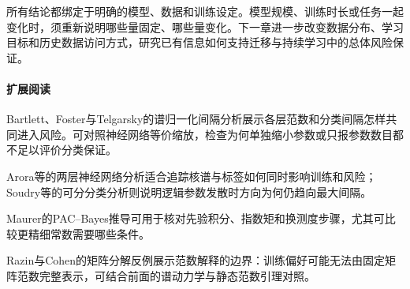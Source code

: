 所有结论都绑定于明确的模型、数据和训练设定。模型规模、训练时长或任务一起变化时，须重新说明哪些量固定、哪些量变化。下一章进一步改变数据分布、学习目标和历史数据访问方式，研究已有信息如何支持迁移与持续学习中的总体风险保证。

\paragraph{扩展阅读}
Bartlett、Foster与Telgarsky的谱归一化间隔分析展示各层范数和分类间隔怎样共同进入风险。可对照神经网络等价缩放，检查为何单独缩小参数或只报参数数目都不足以评价分类保证。

Arora等的两层神经网络分析适合追踪核谱与标签如何同时影响训练和风险；Soudry等的可分分类分析则说明逻辑参数发散时方向为何仍趋向最大间隔。

Maurer的PAC--Bayes推导可用于核对先验积分、指数矩和换测度步骤，尤其可比较更精细常数需要哪些条件。

Razin与Cohen的矩阵分解反例展示范数解释的边界：训练偏好可能无法由固定矩阵范数完整表示，可结合前面的谱动力学与静态范数引理对照。

